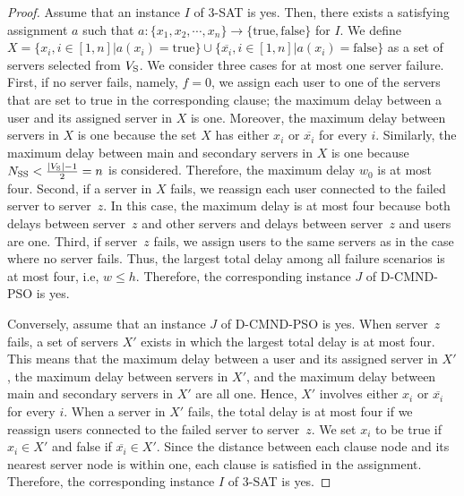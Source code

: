 \documentclass[10pt, letterpaper]{IEEEtran}
\newcommand\blue[1]{\textcolor{blue}{#1}}
\begin{document}
\begin{CJK}{UTF8}{ipxm}
\begin{proof}
  Assume that an instance $I$ of 3-SAT is yes.
  Then, there exists a satisfying assignment $a$ such that $a: \{x_1,x_2,\cdots,x_n\} \rightarrow \{\mathrm{true,false}\}$ for $I$.
  We define $X=\{x_i, i \in [1,n] | a(x_i)=\text{true}\}\cup\{\overline{x_i}, i \in [1,n] |a(x_i)=\text{false}\}$ as a set of servers selected from $V_{\rm{S}}$.
  We consider three cases for at most one server failure.
  First, if no server fails, namely, $f=0$,
  we assign each user to one of the servers that are set to true in the corresponding clause; 
  the maximum delay between a user and its assigned server in $X$ is one.
  Moreover, the maximum delay between servers in $X$ is one because the set $X$ has either $x_i$ or $\overline{x_i}$ for every $i$.
  Similarly, the maximum delay between main and secondary servers in $X$ is one because $N_{\mathrm{SS}} < \frac{|V_{\rm{S}}|-1}{2} = n$ is considered.
  Therefore, the maximum delay $w_0$ is at most four.
  Second, if a server in $X$ fails,
  we reassign each user connected to the failed server to server~$z$.
  In this case, the maximum delay is at most four because both delays between server~$z$ and other servers and delays between server~$z$ and users are one.
  Third, if server~$z$ fails, 
  we assign users to the same servers as in the case where no server fails.
  Thus, the largest total delay among all failure scenarios is at most four, i.e, $w \leq h$.
  Therefore, the corresponding instance $J$ of D-CMND-PSO is yes.

  Conversely, assume that an instance $J$ of D-CMND-PSO is yes.
  When server~$z$ fails, a set of servers $X'$ exists in which the largest total delay is at most four.
  This means that the maximum delay between a user and its assigned server in $X'$, the maximum delay between servers in $X'$, and the maximum delay between main and secondary servers in $X'$ are all one.
  Hence, $X'$ involves either $x_i$ or $\overline{x_i}$ for every $i$.
  When a server in $X'$ fails, the total delay is at most four if we reassign users connected to the failed server to server~$z$.
  We set $x_i$ to be true if $x_i \in X'$ and false if $\overline{x_i} \in X'$.
  Since the distance between each clause node and its nearest server node is within one, each clause is satisfied in the assignment.
  Therefore, the corresponding instance $I$ of 3-SAT is yes.


\end{proof}
\end{CJK}
\end{document}
